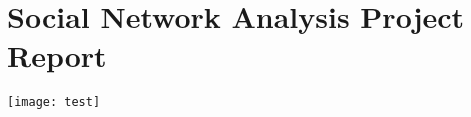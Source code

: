 \section*{Social Network Analysis Project Report}
\begin{center}
\texttt{[image: test]}
\end{center}
